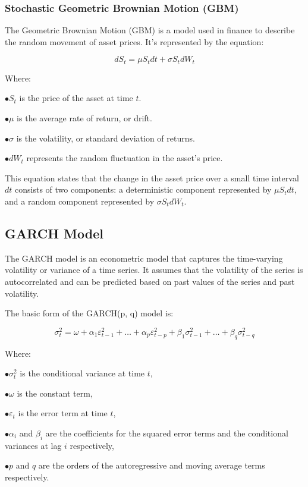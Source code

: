 \subsubsection{Stochastic Geometric Brownian Motion (GBM)}

The Geometric Brownian Motion (GBM) is a model used in finance to describe the random movement of asset prices. It's represented by the equation:

\begin{equation}\label{eq:stochastic_diff_eq}
dS_t = \mu S_t dt + \sigma S_t dW_t
\end{equation}

Where:

$ \bullet S_t $ is the price of the asset at time $ t $.
 
$ \bullet \mu $ is the average rate of return, or drift.

$ \bullet \sigma $ is the volatility, or standard deviation of returns.

$ \bullet dW_t $ represents the random fluctuation in the asset's price.


This equation states that the change in the asset price over a small time interval \( dt \) consists of two components: a deterministic component represented by \( \mu S_t dt \), and a random component represented by \( \sigma S_t dW_t \).

\subsection{GARCH Model}

The GARCH model is an econometric model that captures the time-varying volatility or variance of a time series. It assumes that the volatility of the series is autocorrelated and can be predicted based on past values of the series and past volatility.

The basic form of the GARCH(p, q) model is:

\begin{equation}\label{eq:garch_model}
\sigma_{t}^2 = \omega + \alpha_{1}\varepsilon_{t-1}^2 + \ldots + \alpha_{p}\varepsilon_{t-p}^2 + \beta_{1}\sigma_{t-1}^2 + \ldots + \beta_{q}\sigma_{t-q}^2
\end{equation}

Where:

$ \bullet \sigma_{t}^2 $ is the conditional variance at time $ t $,

$ \bullet \omega $ is the constant term,

$ \bullet \varepsilon_{t} $ is the error term at time $ t $,

$ \bullet \alpha_{i} $ and $ \beta_{i} $ are the coefficients for the squared error terms and the conditional variances at lag $ i $ respectively,

$ \bullet p $ and $ q $ are the orders of the autoregressive and moving average terms respectively.

